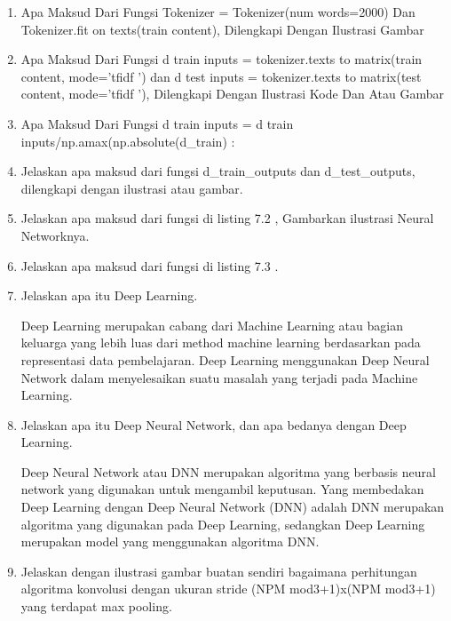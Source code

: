 \begin{enumerate}
\item Apa Maksud Dari Fungsi Tokenizer = Tokenizer(num words=2000) Dan Tokenizer.fit on texts(train content), Dilengkapi Dengan Ilustrasi Gambar

\item  Apa Maksud Dari Fungsi d train inputs = tokenizer.texts to matrix(train content, mode=’tfidf ’) dan d test inputs = tokenizer.texts to matrix(test content, mode=’tfidf ’), Dilengkapi Dengan Ilustrasi Kode Dan Atau Gambar

\item Apa Maksud Dari Fungsi d train inputs = d train inputs/np.amax(np.absolute(d\_train) :

\item Jelaskan apa maksud dari fungsi d\_train\_outputs dan d\_test\_outputs, dilengkapi dengan ilustrasi atau gambar.

\item Jelaskan apa maksud dari fungsi di listing 7.2 , Gambarkan ilustrasi Neural Networknya.

\item Jelaskan apa maksud dari fungsi di listing 7.3 .

\item Jelaskan apa itu Deep Learning.
	\par Deep Learning merupakan cabang dari Machine Learning atau bagian keluarga yang lebih luas dari method machine learning berdasarkan pada representasi data pembelajaran. Deep Learning menggunakan Deep Neural Network dalam menyelesaikan suatu masalah yang terjadi pada Machine Learning.

\item Jelaskan apa itu Deep Neural Network, dan apa bedanya dengan Deep Learning.
	\par Deep Neural Network atau DNN merupakan algoritma yang berbasis neural network yang digunakan untuk mengambil keputusan. Yang membedakan Deep Learning dengan  Deep Neural Network (DNN) adalah DNN merupakan algoritma yang digunakan pada Deep Learning, sedangkan Deep Learning merupakan model yang menggunakan algoritma DNN.

\item Jelaskan dengan ilustrasi gambar buatan sendiri bagaimana perhitungan algoritma konvolusi dengan ukuran stride (NPM mod3+1)x(NPM mod3+1) yang terdapat max pooling.

\end{enumerate}





